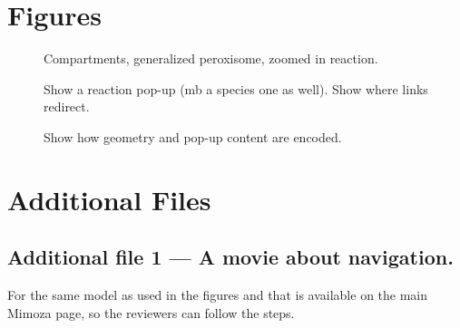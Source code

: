 \documentclass{bmcart}
\begin{document}
\begin{backmatter}

\section*{Figures}
  \begin{figure}[h!]
  \caption{
      Compartments, generalized peroxisome, zoomed in reaction.}
      \end{figure}

\begin{figure}[h!]
  \caption{
      Show a reaction pop-up (mb a species one as well). Show where links redirect.}
      \end{figure}
      
\begin{figure}[h!]
  \caption{
      Show how geometry and pop-up content are encoded.}
      \end{figure}




\section*{Additional Files}
  \subsection*{Additional file 1 --- A movie about navigation.}
   For the same model as used in the figures and that is available on the main Mimoza page, so the reviewers can follow the steps.


\end{backmatter}
\end{document}
